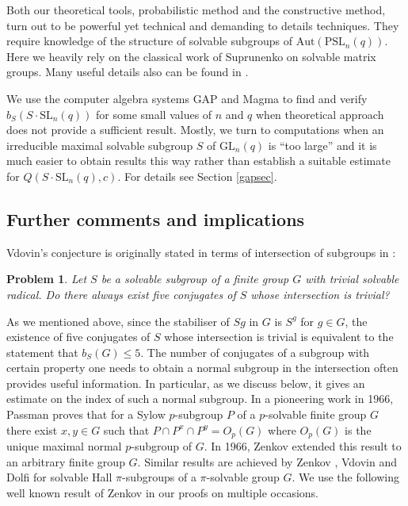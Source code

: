 \documentclass[a4paper,reqno,11pt]{amsart}
\newtheorem{Prob}[Th]{Problem}
\theoremstyle{definition}
\theoremstyle{remark}
\numberwithin{equation}{section}
\newcommand{\Aut}{\mathrm{Aut}}
\newcommand{\SL}{{\mathrm{SL}}}
\newcommand{\PSL}{{\mathrm{PSL}}}
\newcommand{\GL}{{\mathrm{GL}}}
\begin{document}
  Both our theoretical tools, probabilistic method and the constructive method, turn out to be powerful yet technical and demanding to details techniques. They require knowledge of the structure of solvable subgroups of $\Aut(\PSL_n(q)).$  Here we heavily rely on the classical work of Suprunenko \cite{sup} on solvable matrix groups. Many useful details also can be found in \cite{short}.  
  
  We use the  computer algebra systems {\sf GAP} \cite{GAP4} and {\sc Magma} \cite{magma} to find and verify  $b_S(S \cdot \SL_n(q))$ for some small values of $n$ and $q$ when theoretical approach does not provide a sufficient result. Mostly, we turn to computations when an irreducible maximal solvable subgroup $S$ of $\GL_n(q)$ is ``too large'' and it is much easier to obtain results this way rather than establish a suitable estimate for $Q(S \cdot \SL_n(q), c).$ For details see Section \ref{gapsec}.


\subsection{Further comments and implications}

 

Vdovin's conjecture is originally stated in terms of intersection of subgroups in \cite[Problem 17.41 b)]{kt}:

\begin{Prob}\label{prob}
Let $S$ be a solvable subgroup of a finite group $G$ with trivial solvable radical.
 Do there always exist five conjugates of $S$ whose intersection is trivial?
\end{Prob}

As we mentioned above, since the stabiliser of $Sg$ in $G$ is $S^g$ for $g \in G$, the existence of five conjugates of $S$ whose intersection is trivial is equivalent to the statement that $b_S(G)\le 5.$  The number of conjugates of a subgroup with certain property one needs to obtain a normal subgroup in the intersection often provides useful information. In particular, as we discuss below, it gives an estimate on the index of such a normal subgroup. In a pioneering work \cite{passman} in 1966, Passman proves that for a Sylow $p$-subgroup $P$ of a $p$-solvable finite group $G$ there exist $x,y \in G$ such that $P \cap P^x \cap P^y = O_p(G)$ where $O_p(G)$ is the unique maximal normal $p$-subgroup of $G$. In 1966, Zenkov \cite{ZenP} extended this result to an arbitrary finite group $G.$  Similar results are achieved by Zenkov \cite{Zen93}, Vdovin \cite{vdovinReg} and Dolfi \cite{dolfi} for solvable Hall $\pi$-subgroups of a $\pi$-solvable group $G$.  We use the following well known result of Zenkov in our proofs on multiple occasions.   
\end{document}
